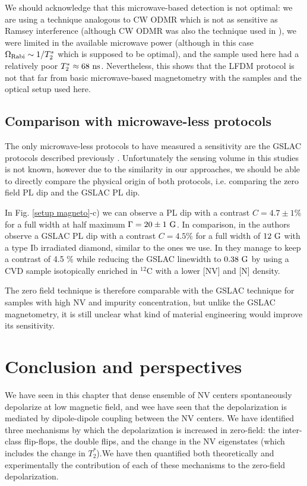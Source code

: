 \documentclass[a4paper, 11pt]{book}
\begin{document}
We should acknowledge that this microwave-based detection is not optimal: we are using a technique analogous to CW ODMR which is not as sensitive as Ramsey interference (although CW ODMR was also the technique used in \citep{barry2016optical}), we were limited in the available microwave power (although in this case $\Omega_{\rm Rabi} \sim 1/T_2^*$ which is supposed to be optimal), and the sample used here had a relatively poor $T_2^* \approx 68\ \rm ns$. Nevertheless, this shows that the LFDM protocol is not that far from basic microwave-based magnetometry with the samples and the optical setup used here.

\subsection{Comparison with microwave-less protocols}
The only microwave-less protocols to have measured a sensitivity are the GSLAC protocols described previously \citep{wickenbrock2016microwave, zheng2020microwave}. Unfortunately the sensing volume in this studies is not known, however due to the similarity in our approaches, we should be able to directly compare the physical origin of both protocols, i.e. comparing the zero field PL dip and the GSLAC PL dip.

In Fig. \ref{setup magneto}-c) we can observe a PL dip with a contrast $C=4.7\pm 1 \% $ for a full width at half maximum $\Gamma=20 \pm 1\ \rm G$. In comparison, in \citep{wickenbrock2016microwave} the authors observe a GSLAC PL dip with a contrast $C=4.5 \%$ for a full width of $12 \ \rm G$ with a type Ib irradiated diamond, similar to the ones we use. In \citep{zheng2020microwave} they manage to keep a contrast of 4.5 \% while reducing the GSLAC linewidth to $0.38\ \rm G$ by using a CVD sample isotopically enriched in $^{12}$C with a lower [NV] and [N] density.

The zero field technique is therefore comparable with the GSLAC technique for samples with high NV and impurity concentration, but unlike the GSLAC magnetometry, it is still unclear what kind of material engineering would improve its sensitivity.

\section{Conclusion and perspectives}
We have seen in this chapter that dense ensemble of NV centers spontaneously depolarize at low magnetic field, and wee have seen that the depolarization is mediated by dipole-dipole coupling between the NV centers. We have identified three mechanisms by which the depolarization is increased in zero-field: the inter-class flip-flops, the double flips, and the change in the NV eigenstates (which includes the change in $T_2^*$).We have then quantified both theoretically and experimentally the contribution of each of these mechanisms to the zero-field depolarization.
\end{document}
